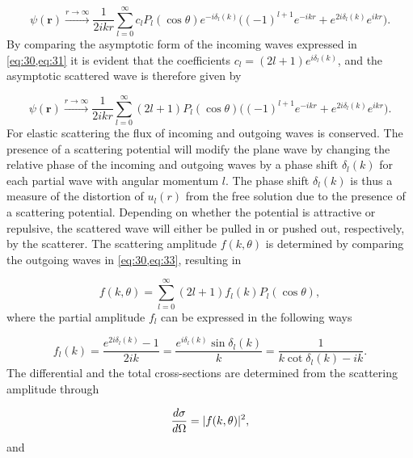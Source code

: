 \begin{equation}\label{eq:31}
\psi(\mathbf{r}) \xrightarrow{r \to \infty} \frac{1}{2ikr} \sum_{l=0}^{\infty} c_l P_l(\cos\theta) e^{-i\delta_l(k)} \big((-1)^{l+1}e^{-ikr} + e^{2i\delta_l(k)}e^{ikr}\big).
\end{equation} 
By comparing the asymptotic form of the incoming waves expressed in \cref{eq:30,eq:31} it is evident that the coefficients $c_l = (2l+1)e^{i\delta_l(k)}$, and the asymptotic scattered wave is therefore given by

\begin{equation}\label{eq:33}
\psi(\mathbf{r}) \xrightarrow{r \to \infty} \frac{1}{2ikr} \sum_{l=0}^{\infty} (2l+1) P_l(\cos\theta)\big((-1)^{l+1}e^{-ikr} + e^{2i\delta_l(k)}e^{ikr}\big).
\end{equation}
For elastic scattering the flux of incoming and outgoing waves is conserved. The presence of a scattering potential will modify the plane wave by changing the relative phase of the incoming and outgoing waves by a phase shift $\delta_l(k)$ for each partial wave with angular momentum $l$. The phase shift $\delta_l(k)$ is thus a measure of the distortion of $u_l(r)$ from the free solution due to the presence of a scattering potential. Depending on whether the potential is attractive or repulsive, the scattered wave will either be pulled in or pushed out, respectively, by the scatterer. The scattering amplitude $f(k,\theta)$ is determined by comparing the outgoing waves in \cref{eq:30,eq:33}, resulting in

\begin{equation}
f(k,\theta) = \sum_{l=0}^{\infty} (2l+1)f_l(k)P_l(\cos\theta),
\end{equation}
where the partial amplitude $f_l$ can be expressed in the following ways

\begin{equation}\label{eq:partialamp}
f_l(k) = \frac{e^{2i\delta_l(k)}-1}{2ik} = \frac{e^{i\delta_l(k)}\sin\delta_l(k)}{k} = \frac{1}{k\cot\delta_l(k) - ik}. 
\end{equation}
The differential and the total cross-sections are determined from the scattering amplitude through 

\begin{equation}
\frac{d\sigma}{d\Omega}=\lvert f(k,\theta)\rvert^2,
\end{equation}
and

